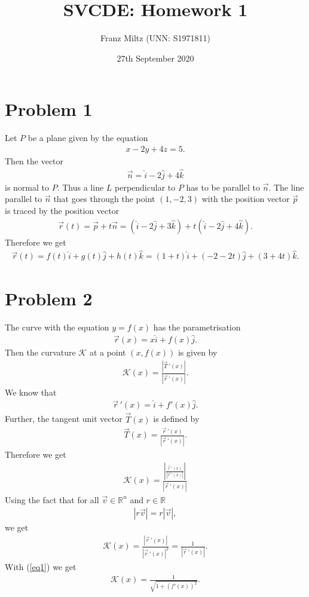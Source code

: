 \documentclass{article}
\title{SVCDE: Homework 1}
\author{Franz Miltz (UNN: S1971811)}
\newcommand{\R}{\mathbb{R}}
\newcommand{\ih}{\widehat i}
\newcommand{\jh}{\widehat j}
\newcommand{\kh}{\widehat k}
\newcommand{\K}{\mathcal{K}}
\newcommand{\dv}[1]{\vec #1\, '}
\renewcommand{\d}[1]{#1'}
\begin{document}
\date{27th September 2020}
\maketitle
\section*{Problem 1}
Let $P$ be a plane given by the equation
\begin{align*}
  x - 2y + 4z = 5.
\end{align*}
Then the vector
\begin{align*}
  \vec n = \ih - 2 \jh + 4 \kh
\end{align*}
is normal to $P$. Thus a line $L$ perpendicular to $P$ has to be
parallel to $\vec n$. The line parallel to $\vec n$ that goes through
the point $(1,-2,3)$ with the position vector $\vec p$ is traced by the position vector
\begin{align*}
  \vec r(t) = \vec p + t \vec n
  = (\ih - 2\jh + 3\kh) + t(\ih - 2\jh + 4\kh).
\end{align*}
Therefore we get
\begin{align*}
  \vec r (t) = f(t)\ih + g(t)\jh + h(t)\kh = (1+t)\ih+(-2-2t)\jh+(3+4t)\kh.
\end{align*}
\section*{Problem 2}
The curve with the equation $y=f(x)$ has the parametrisation
\begin{align*}
  \vec r(x) = x \ih + f(x) \jh.
\end{align*}
Then the curvature $\K$ at a point $(x, f(x))$ is given by
\begin{align*}
  \K(x) = \frac{\left|\dv T(x)\right|}{\left|\dv r(x)\right|}.
\end{align*}
We know that 
\begin{align}
  \label{eq1}
  \dv r (x) = \ih + \d f(x) \jh.
\end{align}
Further, the tangent unit vector $\vec T(x)$ is defined by
\begin{align*}
  \vec T(x) = \frac{\dv r(x)}{\left|\dv r(x)\right|}.
\end{align*}
Therefore we get
\begin{align*}
  \K(x) = \frac{\left|\frac{\dv r(x)}{\left|\dv r(x)\right|}\right|}{\left|\dv r(x)\right|}
\end{align*}
Using the fact that for all $\vec v \in \R^n$ and $r\in\R$
\begin{align*}
  \left|r\vec v\right| = r\left|\vec v\right|,
\end{align*}
we get
\begin{align*}
  \K(x) = \frac{\left|\dv r(x)\right|}{\left|\dv r(x)\right|^2} = \frac{1}{|\dv r(x)|}.
\end{align*}
With (\ref{eq1}) we get
\begin{align*}
  \K(x) = \frac{1}{\sqrt{1+\left(\d f(x)\right)^2}}.
\end{align*}
\end{document}
